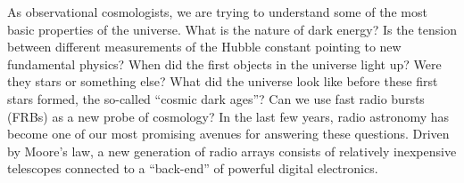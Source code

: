 \documentclass[letterpaper,11pt,preprint]{aastex}
\makeatletter
\def\section{\@startsection {section}{1}{\z@}{1.0ex plus 
1ex minus .2ex}{.2ex plus .2ex}{\large\bf}}
\makeatother
\begin{document}

\singlespace





As observational cosmologists, we are trying to understand some of the
most basic properties of the universe.  What is the nature of dark
energy?  Is the tension between different measurements of the Hubble
constant pointing to new fundamental physics?  When did the first
objects in the universe light up?  Were they stars or something else?
What did the universe look like before these first stars formed, the
so-called ``cosmic dark ages''?  Can we use fast radio bursts (FRBs)
as a new probe of cosmology?  In the last few years, radio astronomy
has become one of our most promising avenues for answering these
questions.  Driven by Moore's law, a new generation of radio arrays
consists of relatively inexpensive telescopes connected to a
``back-end'' of powerful digital electronics.  
\end{document}
